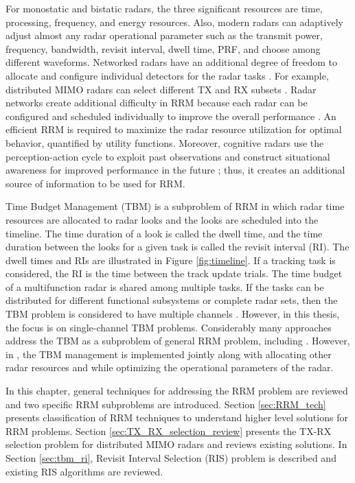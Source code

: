 \documentclass[english, 12pt, a4paper, elec, utf8, a-1b, online]{aaltothesis}
\begin{document}
For monostatic and bistatic radars, the three significant resources are time, processing, frequency, and energy resources. 
Also, modern radars can adaptively adjust almost any radar operational parameter such as the transmit power, frequency, bandwidth, revisit interval, dwell time, PRF, and choose among different waveforms.
Networked radars have an additional degree of freedom to allocate and configure individual detectors for the radar tasks \cite{Moo2016}. 
For example, distributed MIMO radars can select different TX and RX subsets \cite{Godrich2011a, Godrich2011, Sun2014}.
Radar networks create additional difficulty in RRM because each radar can be configured and scheduled individually to improve the overall performance \cite{Sun2014}.
An efficient RRM is required to maximize the radar resource utilization for optimal behavior, quantified by utility functions. 
Moreover, cognitive radars use the perception-action cycle to exploit past observations and construct situational awareness for improved performance in the future \cite{Haykin2006}; thus, it creates an additional source of information to be used for RRM.

Time Budget Management (TBM) is a subproblem of RRM in which radar time resources are allocated to radar looks and the looks are scheduled into the timeline. 
The time duration of a look is called the dwell time, and the time duration between the looks for a given task is called the revisit interval (RI). 
The dwell times and RIs are illustrated in Figure \ref{fig:timeline}. 
If a tracking task is considered, the RI is the time between the track update trials. 
The time budget of a multifunction radar is shared among multiple tasks.
If the tasks can be distributed for different functional subsystems or complete radar sets, then the TBM problem is considered to have multiple channels \cite{Shaghaghi2018}.
However, in this thesis, the focus is on single-channel TBM problems.
Considerably many approaches address the TBM as a subproblem of general RRM problem, including \cite{Koch1999, Wintenby2006, Byrne2016, Xu2010}. 
However, in \cite{Rajkumar1997, Irci2010, Charlish2015a}, the TBM management is implemented jointly along with allocating other radar resources and while optimizing the operational parameters of the radar.


In this chapter, general techniques for addressing the RRM problem are reviewed and two specific RRM subproblems are introduced.
Section \ref{sec:RRM_tech} presents classification of RRM techniques to understand higher level solutions for RRM problems.
Section \ref{sec:TX_RX_selection_review} presents the TX-RX selection problem for distributed MIMO radars and reviews existing solutions. 
In Section \ref{sec:tbm_ri}, Revisit Interval Selection (RIS) problem is described and existing RIS algorithms are reviewed.
\end{document}
